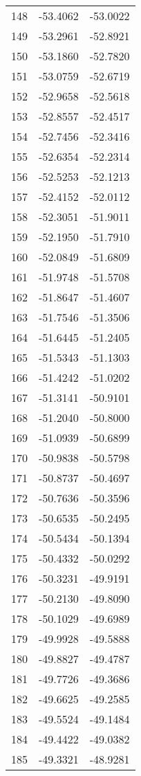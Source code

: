 \documentclass{article}
\begin{document}
\begin{longtable}{|c|c|c|}
148 & -53.4062 & -53.0022 \\
149 & -53.2961 & -52.8921 \\
150 & -53.1860 & -52.7820 \\
151 & -53.0759 & -52.6719 \\
152 & -52.9658 & -52.5618 \\
153 & -52.8557 & -52.4517 \\
154 & -52.7456 & -52.3416 \\
155 & -52.6354 & -52.2314 \\
156 & -52.5253 & -52.1213 \\
157 & -52.4152 & -52.0112 \\
158 & -52.3051 & -51.9011 \\
159 & -52.1950 & -51.7910 \\
160 & -52.0849 & -51.6809 \\
161 & -51.9748 & -51.5708 \\
162 & -51.8647 & -51.4607 \\
163 & -51.7546 & -51.3506 \\
164 & -51.6445 & -51.2405 \\
165 & -51.5343 & -51.1303 \\
166 & -51.4242 & -51.0202 \\
167 & -51.3141 & -50.9101 \\
168 & -51.2040 & -50.8000 \\
169 & -51.0939 & -50.6899 \\
170 & -50.9838 & -50.5798 \\
171 & -50.8737 & -50.4697 \\
172 & -50.7636 & -50.3596 \\
173 & -50.6535 & -50.2495 \\
174 & -50.5434 & -50.1394 \\
175 & -50.4332 & -50.0292 \\
176 & -50.3231 & -49.9191 \\
177 & -50.2130 & -49.8090 \\
178 & -50.1029 & -49.6989 \\
179 & -49.9928 & -49.5888 \\
180 & -49.8827 & -49.4787 \\
181 & -49.7726 & -49.3686 \\
182 & -49.6625 & -49.2585 \\
183 & -49.5524 & -49.1484 \\
184 & -49.4422 & -49.0382 \\
185 & -49.3321 & -48.9281 \\

\end{longtable}
\end{document}
